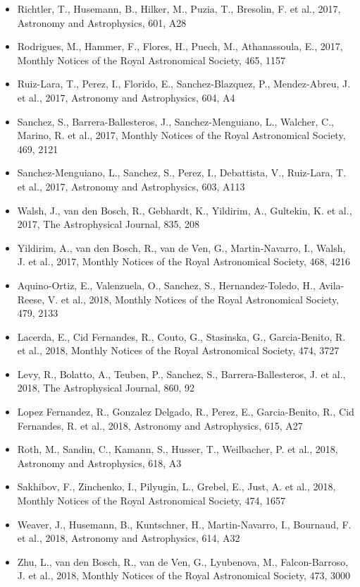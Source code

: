 \documentclass{letter}
\begin{document}
\begin{enumerate}
\begin{itemize}
\item Richtler, T., Husemann, B., Hilker, M., Puzia, T., Bresolin, F. et al., 2017, Astronomy and Astrophysics, 601, A28
\item Rodrigues, M., Hammer, F., Flores, H., Puech, M., Athanassoula, E., 2017, Monthly Notices of the Royal Astronomical Society, 465, 1157
\item Ruiz-Lara, T., Perez, I., Florido, E., Sanchez-Blazquez, P., Mendez-Abreu, J. et al., 2017, Astronomy and Astrophysics, 604, A4
\item Sanchez, S., Barrera-Ballesteros, J., Sanchez-Menguiano, L., Walcher, C., Marino, R. et al., 2017, Monthly Notices of the Royal Astronomical Society, 469, 2121
\item Sanchez-Menguiano, L., Sanchez, S., Perez, I., Debattista, V., Ruiz-Lara, T. et al., 2017, Astronomy and Astrophysics, 603, A113
\item Walsh, J., van den Bosch, R., Gebhardt, K., Yildirim, A., Gultekin, K. et al., 2017, The Astrophysical Journal, 835, 208
\item Yildirim, A., van den Bosch, R., van de Ven, G., Martin-Navarro, I., Walsh, J. et al., 2017, Monthly Notices of the Royal Astronomical Society, 468, 4216
\item Aquino-Ortiz, E., Valenzuela, O., Sanchez, S., Hernandez-Toledo, H., Avila-Reese, V. et al., 2018, Monthly Notices of the Royal Astronomical Society, 479, 2133
\item Lacerda, E., Cid Fernandes, R., Couto, G., Stasinska, G., Garcia-Benito, R. et al., 2018, Monthly Notices of the Royal Astronomical Society, 474, 3727
\item Levy, R., Bolatto, A., Teuben, P., Sanchez, S., Barrera-Ballesteros, J. et al., 2018, The Astrophysical Journal, 860, 92
\item Lopez Fernandez, R., Gonzalez Delgado, R., Perez, E., Garcia-Benito, R., Cid Fernandes, R. et al., 2018, Astronomy and Astrophysics, 615, A27
\item Roth, M., Sandin, C., Kamann, S., Husser, T., Weilbacher, P. et al., 2018, Astronomy and Astrophysics, 618, A3
\item Sakhibov, F., Zinchenko, I., Pilyugin, L., Grebel, E., Just, A. et al., 2018, Monthly Notices of the Royal Astronomical Society, 474, 1657
\item Weaver, J., Husemann, B., Kuntschner, H., Martin-Navarro, I., Bournaud, F. et al., 2018, Astronomy and Astrophysics, 614, A32
\item Zhu, L., van den Bosch, R., van de Ven, G., Lyubenova, M., Falcon-Barroso, J. et al., 2018, Monthly Notices of the Royal Astronomical Society, 473, 3000

\end{itemize}
\end{enumerate}
\end{document}
